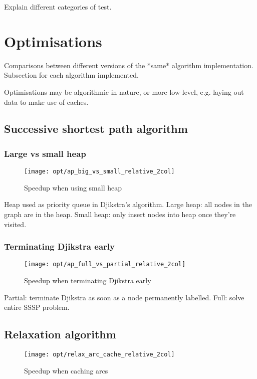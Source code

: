 Explain different categories of test.

\section{Optimisations} \label{sec:eval-optimisations}

Comparisons between different versions of the *same* algorithm implementation. Subsection for each algorithm implemented.

Optimisations may be algorithmic in nature, or more low-level, e.g. laying out data to make use of caches.

\subsection{Successive shortest path algorithm}

\subsubsection{Large vs small heap}

\begin{figure}
  \centering
  \texttt{[image: opt/ap\_big\_vs\_small\_relative\_2col]}
  \caption{Speedup when using small heap}
  \label{fig:opt-ap-big-vs-small}
\end{figure}

Heap used as priority queue in Djikstra's algorithm. Large heap: all nodes in the graph are in the heap. Small heap: only insert nodes into heap once they're visited.

\subsubsection{Terminating Djikstra early}

\begin{figure}
    \centering
    \texttt{[image: opt/ap\_full\_vs\_partial\_relative\_2col]}
    \caption{Speedup when terminating Djikstra early}
    \label{fig:opt-ap-terminate-djikstra-early}
\end{figure}

Partial: terminate Djikstra as soon as a node permanently labelled. Full: solve entire SSSP problem.

\subsection{Relaxation algorithm}

\begin{figure}
    \centering
    \texttt{[image: opt/relax\_arc\_cache\_relative\_2col]}
    \caption{Speedup when caching arcs}
    \label{fig:opt-relax-cache-arcs}
\end{figure}

